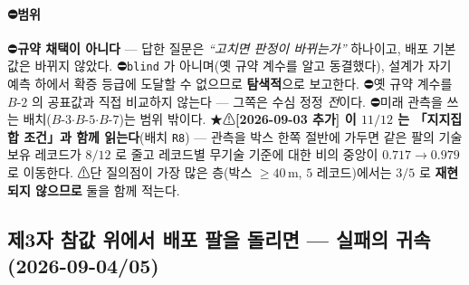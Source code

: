 \documentclass[11pt]{report}
\numberwithin{equation}{chapter}
\numberwithin{figure}{chapter}
\numberwithin{table}{chapter}
\begin{document}
\paragraph{⛔범위}
⛔\textbf{규약 채택이 아니다} --- 답한 질문은 \emph{``고치면 판정이 바뀌는가''} 하나이고,
배포 기본값은 바뀌지 않았다. ⛔\texttt{blind} 가 아니며(옛 규약 계수를 알고 동결했다),
설계가 자기 예측 하에서 확증 등급에 도달할 수 없으므로 \textbf{탐색적}으로 보고한다.
⛔옛 규약 계수를 $B$-$2$ 의 공표값과 직접 비교하지 않는다 --- 그쪽은 수심 정정 \emph{전}이다.
⛔미래 관측을 쓰는 배치($B$-$3$$\cdot$$B$-$5$$\cdot$$B$-$7$)는 범위 밖이다.
★⚠\textbf{[2026-09-03 추가] 이 $11/12$ 는 「지지집합 조건」과 함께 읽는다}(배치
\texttt{R8}) --- 관측을 박스 한쪽 절반에 가두면 같은 팔의 기술 보유 레코드가 $8/12$ 로
줄고 레코드별 무기술 기준에 대한 비의 중앙이 $0.717 \to 0.979$ 로 이동한다.
⚠단 질의점이 가장 많은 층(박스 $\geq 40$\,m, $5$ 레코드)에서는 $3/5$ 로
\textbf{재현되지 않으므로} 둘을 함께 적는다.

\subsection{제3자 참값 위에서 배포 팔을 돌리면 --- 실패의 귀속 (2026-09-04/05)}
\label{sec:results_t11}
\end{document}
